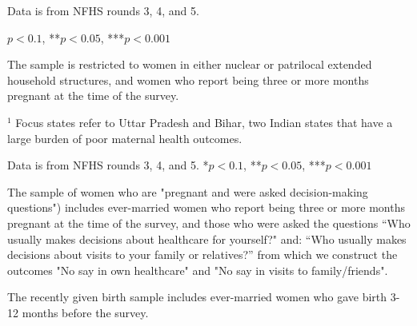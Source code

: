 \documentclass[12pt]{article}
\begin{document}
\begin{table}[!htbp]
    \centering
    \begin{threeparttable}[t]
        \caption{:  Proportion of pregnant women in patrilocal extended households is increasing among all subgroups}
        \label{tab:patrilocal_subgroups}

        \scriptsize
        \setlength{\tabcolsep}{6pt}
        \renewcommand{\arraystretch}{1.2}

        

        \begin{tablenotes}
            \item Data is from NFHS rounds 3, 4, and 5.
            \item *$p<0.1$, **$p<0.05$, ***$p<0.001$
            \item The sample is restricted to women in either nuclear or patrilocal extended household structures, and women who report being three or more months pregnant at the time of the survey.
            \item $^1$ Focus states refer to Uttar Pradesh and Bihar, two Indian states that have a large burden of poor maternal health outcomes.
        \end{tablenotes}
    \end{threeparttable}
\end{table}

\begin{landscape}
\begin{table}[!htbp]
    \centering
    \begin{threeparttable}[t]
        \caption{:  Pregnant women in patrilocal extended households are advantaged in wealth and maternal healthcare use, but disadvantaged in autonomy outcomes}
        \label{tab:sumstats}

        \scriptsize
        \setlength{\tabcolsep}{6pt}
        \renewcommand{\arraystretch}{1.1}
        \label{tab:sumstats}
        

        \begin{tablenotes}
            \item Data is from NFHS rounds 3, 4, and 5. *$p<0.1$, **$p<0.05$, ***$p<0.001$
            \item The sample of women who are "pregnant and were asked decision-making questions") includes ever-married women who report being three or more months pregnant at the time of the survey, and those who were asked the questions ``Who usually makes decisions about healthcare for yourself?"  and: ``Who usually makes decisions about visits to your family or relatives?'' from which we construct the outcomes "No say in own healthcare" and "No say in visits to family/friends". 
            \item The recently given birth sample includes ever-married women who gave birth 3-12 months before the survey. 
        \end{tablenotes}
    \end{threeparttable}
\end{table}
\end{landscape}
\end{document}
